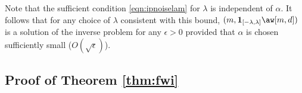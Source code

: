  Note that the sufficient condition \ref{eqn:ipnoiselam} for
$\lambda$ is independent of $\alpha$. It follows that for any choice
of $\lambda$ consistent with this bound, $(m,{\bf
  1}_{[-\lambda,\lambda]}\aw[m,d])$ is a solution of the inverse
problem for any $\epsilon > 0$ provided that $\alpha$ is chosen
sufficiently small ($O(\sqrt{\epsilon})$).



\subsection{Proof of Theorem \ref{thm:fwi}}










